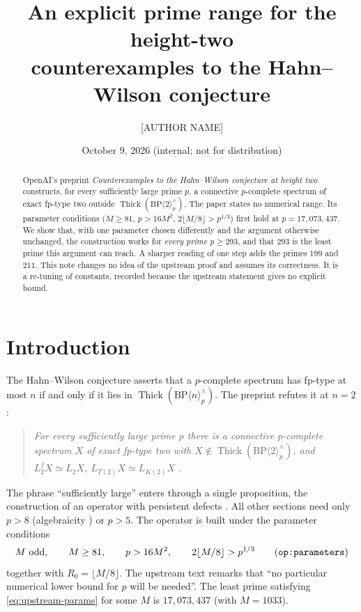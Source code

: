 \documentclass[11pt]{amsart}
\title[An explicit prime range for height-two Hahn--Wilson counterexamples]{An explicit prime range for the height-two\\ counterexamples to the Hahn--Wilson conjecture}
\author{[AUTHOR NAME]}
\date{October 9, 2026 (internal; not for distribution)}
\numberwithin{equation}{section}
\theoremstyle{definition}
\theoremstyle{remark}
\newcommand{\BP}{\mathrm{BP}}
\DeclareMathOperator{\Thick}{Thick}
\newcommand{\up}[1]{\texttt{#1}}
\begin{document}
\begin{abstract}
OpenAI's preprint \emph{Counterexamples to the Hahn--Wilson conjecture at
height two} constructs, for every sufficiently large prime $p$, a
connective $p$-complete spectrum of exact fp-type two outside
$\Thick(\BP\langle2\rangle_p^\wedge)$. The paper states no numerical
range. Its parameter conditions
($M\ge81$, $p>16M^2$, $2\lfloor M/8\rfloor>p^{1/3}$) first hold at
$p=17{,}073{,}437$. We show that, with one parameter chosen differently
and the argument otherwise unchanged, the construction works for
\emph{every prime $p\ge293$}, and that $293$ is the least prime this
argument can reach. A sharper reading of one step adds the primes
$199$ and $211$. This note changes no idea of the upstream proof and
assumes its correctness. It is a re-tuning of constants, recorded
because the upstream statement gives no explicit bound.
\end{abstract}

\maketitle

\section{Introduction}

The Hahn--Wilson conjecture \cite[Conjecture~1.1]{LP2026} asserts that
a $p$-complete spectrum has fp-type at most $n$ if and only if it lies
in $\Thick(\BP\langle n\rangle_p^\wedge)$. The preprint
\cite{OAI-HW2} refutes it at $n=2$:

\begin{quote}
\emph{For every sufficiently large prime $p$ there is a connective
$p$-complete spectrum $X$ of exact fp-type two with
$X\notin\Thick(\BP\langle2\rangle_p^\wedge)$, and
$L_2^fX\simeq L_2X$, $L_{T(2)}X\simeq L_{K(2)}X$}
\cite[Theorem~1.1]{OAI-HW2}.
\end{quote}

The phrase ``sufficiently large'' enters through a single proposition,
the construction of an operator with persistent defects
\cite[Prop.~\up{op:operator}]{OAI-HW2}. All other sections need only
$p>8$ (algebraicity \cite[Cor.~6.9]{Pstragowski2021}) or $p>5$. The
operator is built under the parameter conditions
\begin{equation}\label{eq:upstream-params}
 M\ \text{odd},\qquad M\ge81,\qquad p>16M^2,\qquad 2\lfloor M/8\rfloor>p^{1/3}
 \tag{\up{op:parameters}}
\end{equation}
together with $R_0=\lfloor M/8\rfloor$. The upstream text remarks that
``no particular numerical lower bound for $p$ will be needed''. The
least prime satisfying \eqref{eq:upstream-params} for some $M$ is
$17{,}073{,}437$ (with $M=1033$).
\end{document}
